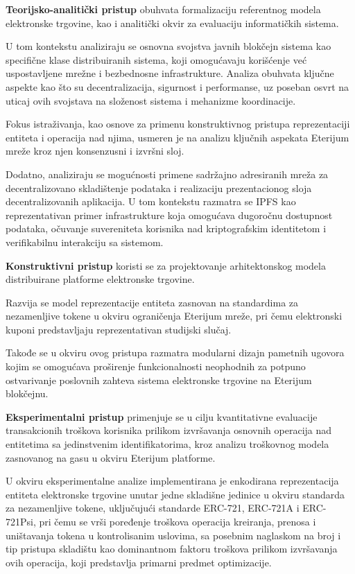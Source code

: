 \begin{description}
\item \textbf{Teorijsko-analitički pristup} obuhvata formalizaciju referentnog modela elektronske trgovine, kao i analitički okvir za evaluaciju informatičkih sistema.

U tom kontekstu analiziraju se osnovna svojstva javnih blokčejn sistema kao specifične klase distribuiranih sistema, koji omogućavaju korišćenje već uspostavljene mrežne i bezbednosne infrastrukture. Analiza obuhvata ključne aspekte kao što su decentralizacija, sigurnost i performanse, uz poseban osvrt na uticaj ovih svojstava na složenost sistema i mehanizme koordinacije. 

Fokus istraživanja, kao osnove za primenu konstruktivnog pristupa reprezentaciji entiteta i operacija nad njima, usmeren je na analizu ključnih aspekata Eterijum mreže kroz njen konsenzusni i izvršni sloj.

Dodatno, analiziraju se mogućnosti primene sadržajno adresiranih mreža za decentralizovano skladištenje podataka i realizaciju prezentacionog sloja decentralizovanih aplikacija. U tom kontekstu razmatra se IPFS kao reprezentativan primer infrastrukture koja omogućava dugoročnu dostupnost podataka, očuvanje suvereniteta korisnika nad kriptografskim identitetom i verifikabilnu interakciju sa sistemom.

\item \textbf{Konstruktivni pristup} koristi se za projektovanje arhitektonskog modela distribuirane platforme elektronske trgovine.

Razvija se model reprezentacije entiteta zasnovan na standardima za nezamenljive tokene u okviru ograničenja Eterijum mreže, pri čemu elektronski kuponi predstavljaju reprezentativan studijski slučaj.

Takođe se u okviru ovog pristupa razmatra modularni dizajn pametnih ugovora kojim se omogućava proširenje funkcionalnosti neophodnih za potpuno ostvarivanje poslovnih zahteva sistema elektronske trgovine na Eterijum blokčejnu.

\item \textbf{Eksperimentalni pristup} primenjuje se u cilju kvantitativne evaluacije transakcionih troškova korisnika prilikom izvršavanja osnovnih operacija nad entitetima sa jedinstvenim identifikatorima, kroz analizu troškovnog modela zasnovanog na gasu u okviru Eterijum platforme.

U okviru eksperimentalne analize implementirana je enkodirana reprezentacija entiteta elektronske trgovine unutar jedne skladišne jedinice u okviru standarda za nezamenljive tokene, uključujući standarde ERC-721, ERC-721A i ERC-721Psi, pri čemu se vrši poređenje troškova operacija kreiranja, prenosa i uništavanja tokena u kontrolisanim uslovima, sa posebnim naglaskom na broj i tip pristupa skladištu kao dominantnom faktoru troškova prilikom izvršavanja ovih operacija, koji predstavlja primarni predmet optimizacije.


\end{description}

